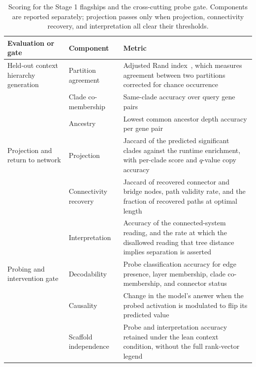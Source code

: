 \begin{table}[htb!]
\centering
\caption[Scoring for the Stage 1 flagships and probe gate]{Scoring for the Stage 1 flagships and the cross-cutting probe gate. Components are reported separately; projection passes only when projection, connectivity recovery, and interpretation all clear their thresholds.}
\label{tab:ch4-flagship-scoring}
\footnotesize
\setlength{\tabcolsep}{4pt}
\renewcommand{\arraystretch}{1.15}
\begin{tabularx}{\textwidth}{@{}>{\raggedright\arraybackslash}p{} >{\raggedright\arraybackslash}p{} Y@{}}
\toprule
\textbf{Evaluation or gate} & \textbf{Component} & \textbf{Metric} \\
\midrule
Held-out context hierarchy generation
  & Partition agreement & Adjusted Rand index~\cite{hubert1985comparing}, which measures agreement between two partitions corrected for chance occurrence \\
\cmidrule(l){2-3}
  & Clade co-membership & Same-clade accuracy over query gene pairs \\
\cmidrule(l){2-3}
  & Ancestry & Lowest common ancestor depth accuracy per gene pair \\
\midrule
Projection and return to network
  & Projection & Jaccard of the predicted significant clades against the runtime enrichment, with per-clade score and $q$-value copy accuracy \\
\cmidrule(l){2-3}
  & Connectivity recovery & Jaccard of recovered connector and bridge nodes, path validity rate, and the fraction of recovered paths at optimal length \\
\cmidrule(l){2-3}
  & Interpretation & Accuracy of the connected-system reading, and the rate at which the disallowed reading that tree distance implies separation is asserted \\
\midrule
Probing and intervention gate
  & Decodability & Probe classification accuracy for edge presence, layer membership, clade co-membership, and connector status \\
\cmidrule(l){2-3}
  & Causality & Change in the model's answer when the probed activation is modulated to flip its predicted value \\
\cmidrule(l){2-3}
  & Scaffold independence & Probe and interpretation accuracy retained under the lean context condition, without the full rank-vector legend \\
\bottomrule
\end{tabularx}
\end{table}

